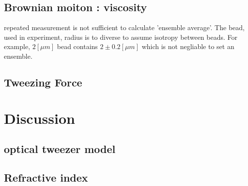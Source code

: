 \documentclass{article}
\begin{document}
\subsection{Brownian moiton : viscosity}
\label{results:brownian_motion_raw_fig}
repeated measurement is not sufficient to calculate 'ensemble average'.
The bead, used in experiment, radius is to diverse to assume isotropy between beads.
For example, $2 [\mu m]$ bead contains $2 \pm 0.2 [\mu m]$ which is not negliable to set an ensemble.
\cite{polybead_spec}
\label{results:viscosity}
\label{results:modified_brownian_analysis}
\subsection{Tweezing Force}
\label{results:tweezing_force}

\section{Discussion}

\subsection{optical tweezer model}

\subsection{Refractive index}
\label{discussion:refractive_index_calculation}



\end{document}
